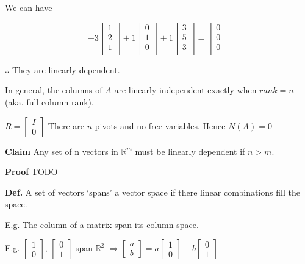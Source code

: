 \documentclass[12pt,a4paper]{article}
\begin{document}
We can have 

\[
  -3
  \begin{bmatrix}
    1 \\
    2 \\
    1 \\
  \end{bmatrix} +
  1
  \begin{bmatrix}
    0 \\
    1 \\
    0 \\
  \end{bmatrix} +
  1
  \begin{bmatrix}
    3 \\
    5 \\
    3 \\
  \end{bmatrix} =
  \begin{bmatrix}
    0 \\
    0 \\
    0 \\
  \end{bmatrix}
\]

$\therefore$ They are linearly dependent.

In general, the columns of $A$ are linearly independent exactly when $rank = n$ (aka. full column rank).

$
R = 
\begin{bmatrix}
  I \\
  0
\end{bmatrix}
$
There are $n$ pivots and no free variables. Hence $N(A) = {\underline{0}}$

\textbf{Claim} Any set of n vectors in $\mathbb{R}^m$  must be linearly dependent if $n>m$.

\textbf{Proof} TODO

\textbf{Def.} A set of vectors `spans' a vector space if there linear combinations fill the space.

E.g. The column of a matrix span its column space.

E.g.
$
\begin{bmatrix}
  1 \\
  0
\end{bmatrix},\,
\begin{bmatrix}
  0 \\
  1
\end{bmatrix}
$ span $\mathbb{R}^2$
$
\Rightarrow
\begin{bmatrix}
  a \\
  b
\end{bmatrix} = 
a
\begin{bmatrix}
  1 \\
  0
\end{bmatrix} +
b
\begin{bmatrix}
  0 \\
  1
\end{bmatrix}
$
\end{document}
